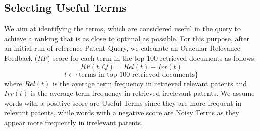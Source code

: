 \subsection{Selecting Useful Terms}
\label{OracularTermSelection}
We aim at identifying the terms, which are considered useful in the query to achieve a ranking that is as close to optimal as possible. For this purpose, 
after an initial run of reference Patent Query, we
calculate an Oracular Relevance Feedback ($\mathit{RF}$) score for each term in the top-100
retrieved documents as follows:
\begin{equation}
RF(t,Q)=Rel(t)-Irr(t) 
 \label{eq:score}
\end{equation}
\begin{displaymath}t\in \lbrace \mbox{terms in top-100 retrieved documents}\rbrace\end{displaymath}
where $ \mathit{Rel(t)} $ is the average term frequency in retrieved relevant patents and $ \mathit{Irr(t)} $ is the average term frequency in retrieved irrelevant patents. We assume words with a positive score are Useful Terms since they are more frequent in relevant patents, while words with a negative score are Noisy Terms as they appear more frequently in irrelevant patents. 

